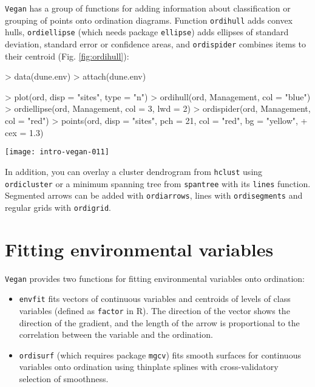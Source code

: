 \documentclass[a4paper,10pt]{amsart}
\begin{document}
\texttt{Vegan} has a group of functions for adding information about
classification or grouping of points onto ordination diagrams.
Function \texttt{ordihull} adds convex hulls, \texttt{ordiellipse}
(which needs package \texttt{ellipse}) adds ellipses of standard
deviation, standard error or confidence areas, and \texttt{ordispider}
combines items to their centroid (Fig. \ref{fig:ordihull}):
\begin{Schunk}
\begin{Sinput}
> data(dune.env)
> attach(dune.env)
\end{Sinput}
\end{Schunk}
\begin{Schunk}
\begin{Sinput}
> plot(ord, disp = "sites", type = "n")
> ordihull(ord, Management, col = "blue")
> ordiellipse(ord, Management, col = 3, lwd = 2)
> ordispider(ord, Management, col = "red")
> points(ord, disp = "sites", pch = 21, col = "red", bg = "yellow", 
+     cex = 1.3)
\end{Sinput}
\end{Schunk}
\begin{SCfigure}
\texttt{[image: intro-vegan-011]}
\caption{Convex hull, standard error ellipse and a spider web diagram
  for Management levels in ordination.}
\label{fig:ordihull}
\end{SCfigure}
In addition, you can overlay a cluster dendrogram from \texttt{hclust}
using \texttt{ordicluster} or a minimum spanning tree from
\texttt{spantree} with its \texttt{lines} function.  Segmented arrows
can be added with \texttt{ordiarrows}, lines with
\texttt{ordisegments} and regular grids with \texttt{ordigrid}.

\section{Fitting environmental variables}

\texttt{Vegan} provides two functions for fitting environmental
variables onto ordination:
\begin{itemize}
\item \texttt{envfit} fits vectors of continuous variables and
  centroids of levels of class variables (defined as \texttt{factor}
  in \textsf{R}).  The direction of the vector shows the direction of
  the gradient, and the length of the arrow is proportional to the
  correlation between the variable and the ordination.
\item \texttt{ordisurf} (which requires package \texttt{mgcv}) fits
  smooth surfaces for continuous variables onto ordination using
  thinplate splines with cross-validatory selection of smoothness.
\end{itemize}
\end{document}

